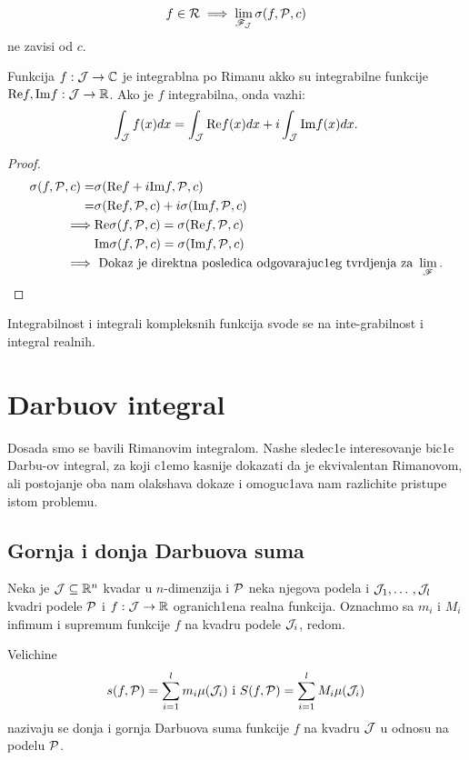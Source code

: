 \documentclass[../main.tex]{subfiles}
\begin{document}
    \nap $$f \in \mathcal{R} \implies \lim_{\mathscr{F}_{\mathcal{J}}}\sigma(f,\mathcal{P},c)$$ ne zavisi od $c$.

    \begin{tvr}
	Funkcija $f: \mathcal{J} \to \mathbb{C}$ je integrablna po Rimanu akko su integrabilne funkcije $\mathrm{Re} f, \mathrm{Im} f: \mathcal{J} \to \mathbb{R}$. Ako je $f$ integrabilna, onda vazhi:
	\[\int_{\mathcal{J}} f(x)dx = \int_{\mathcal{J}} \mathrm{Re} f(x) dx + i\int_{\mathcal{J}}\mathrm{Im} f(x) dx.\]
    \end{tvr}
    \begin{proof}
	\begin{align*}
	    \sigma(f,\mathcal{P},c) = &\sigma(\mathrm{Re} f+ i\mathrm{Im} f,\mathcal{P},c)\\
	    = &\sigma(\mathrm{Re} f,\mathcal{P},c) + i \sigma(\mathrm{Im} f,\mathcal{P},c)\\
	    \implies &\mathrm{Re} \sigma(f,\mathcal{P},c) = \sigma(\mathrm{Re} f,\mathcal{P},c)\\ 
	    & \mathrm{Im} \sigma(f,\mathcal{P},c) = \sigma(\mathrm{Im} f,\mathcal{P},c)\\
	    \implies &\text{ Dokaz je direktna posledica odgovarajuc1eg tvrdjenja za } \lim_{\mathscr{F}}.
	\end{align*}     \end{proof}


    \begin{posl}
    	Integrabilnost i integrali kompleksnih funkcija svode se na inte-grabilnost i integral realnih.
    \end{posl}

\section{Darbuov integral}

    Dosada smo se bavili Rimanovim integralom. Nashe sledec1e interesovanje bic1e Darbu-ov integral, za koji c1emo kasnije dokazati da je ekvivalentan Rimanovom,
    ali postojanje oba nam olakshava dokaze i omoguc1ava nam razlichite pristupe istom problemu.

\subsection{Gornja i donja Darbuova suma}
    
    Neka je $\mathcal{J}\subseteq \mathbb{R}^n$ kvadar u $n$-dimenzija i $\mathcal{P}$ neka njegova podela i $\mathcal{J}_1, \dotso, \mathcal{J}_l$ kvadri podele $\mathcal{P}$ i $f:\mathcal{J} \to \mathbb{R}$ ogranich1ena realna funkcija.
    Oznachmo sa $m_i$ i $M_i$  infimum i supremum funkcije $f$ na kvadru podele $\mathcal{J}_i$, redom.

    \begin{de}
    	Velichine 
	\[s(f,\mathcal{P})=\sum_{i=1}^lm_i\mu(\mathcal{J}_i)\text{ i }S(f,\mathcal{P})=\sum_{i=1}^lM_i\mu(\mathcal{J}_i)\]
	nazivaju se donja i gornja Darbuova suma funkcije $f$ na kvadru $\mathcal{J}$ u odnosu na podelu $\mathcal{P}$. 
    \end{de}
    
\end{document}
